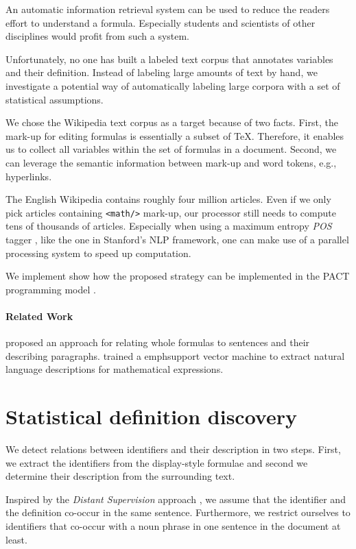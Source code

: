 \documentclass[runningheads]{llncs}
\begin{document}
An automatic information retrieval system can be used to reduce the readers
effort to understand a formula. Especially students and scientists of other
disciplines would profit from such a system.

Unfortunately, no one has built a labeled text corpus that annotates variables
and their definition. Instead of labeling large amounts of text by hand, we
investigate a potential way of automatically labeling large corpora with a set
of statistical assumptions.

We chose the Wikipedia text corpus as a target because of two facts. First,
the mark-up for editing formulas is essentially a subset of \TeX. Therefore,
it enables us to collect all variables within the set of formulas in a
document. Second, we can leverage the semantic information between mark-up and
word tokens, e.g., hyperlinks.

The English Wikipedia contains roughly four million articles. Even if we only
pick articles containing \texttt{<math/>} mark-up, our processor still needs
to compute tens of thousands of articles. Especially when using a maximum
entropy \emph{POS} tagger \cite{Rathna96}, like the one in Stanford's NLP
framework, one can make use of a parallel processing system to speed up
computation.

We implement  show how the proposed strategy can be implemented in the PACT
programming model \cite{Alexandrov2010}.


\paragraph{Related Work}
\citeauthor{Quoc2010}\cite{Quoc2010} proposed an approach for
relating whole formulas to sentences and their describing paragraphs.
\citeauthor{Yokoi}\cite{Yokoi} trained a emph{support vector machine} to extract
natural language descriptions for mathematical expressions.


\section{Statistical definition discovery}
We detect relations between identifiers and their description in two steps.
First, we extract the identifiers from the display-style formulae and
second we determine their description from the surrounding text.

Inspired by the \emph{Distant Supervision} approach \cite{Mintz2008},
we assume that the identifier and the definition co-occur in the same sentence.
Furthermore, we restrict ourselves to identifiers that co-occur with a noun
phrase in one sentence in the document at least.
\end{document}
